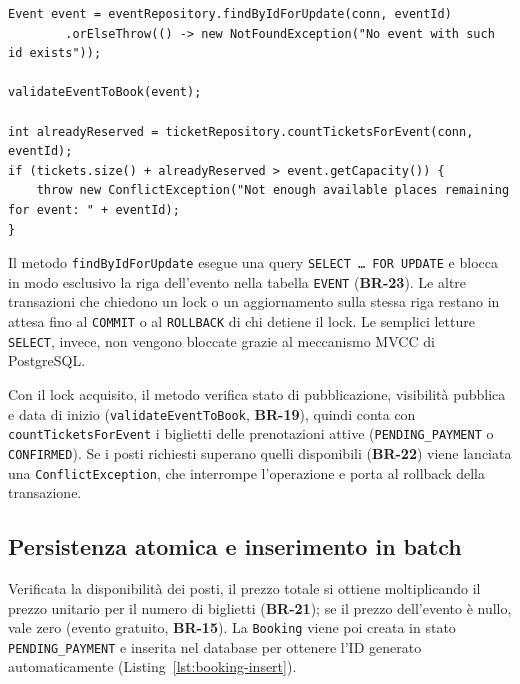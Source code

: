 \begin{lstlisting}[caption={Acquisizione del lock pessimistico sull'evento e controllo della capienza.}, label={lst:booking-lock}]
Event event = eventRepository.findByIdForUpdate(conn, eventId)
        .orElseThrow(() -> new NotFoundException("No event with such id exists"));

validateEventToBook(event);

int alreadyReserved = ticketRepository.countTicketsForEvent(conn, eventId);
if (tickets.size() + alreadyReserved > event.getCapacity()) {
    throw new ConflictException("Not enough available places remaining for event: " + eventId);
}
\end{lstlisting}

Il metodo \texttt{findByIdForUpdate} esegue una query \texttt{SELECT \dots\ FOR UPDATE} e blocca in modo esclusivo la riga dell'evento nella tabella \texttt{EVENT} (\textbf{BR-23}). Le altre transazioni che chiedono un lock o un aggiornamento sulla stessa riga restano in attesa fino al \texttt{COMMIT} o al \texttt{ROLLBACK} di chi detiene il lock. Le semplici letture \texttt{SELECT}, invece, non vengono bloccate grazie al meccanismo MVCC di PostgreSQL.

Con il lock acquisito, il metodo verifica stato di pubblicazione, visibilità pubblica e data di inizio (\texttt{validateEventToBook}, \textbf{BR-19}), quindi conta con \texttt{countTicketsForEvent} i biglietti delle prenotazioni attive (\texttt{PENDING\_PAYMENT} o \texttt{CONFIRMED}). Se i posti richiesti superano quelli disponibili (\textbf{BR-22}) viene lanciata una \texttt{ConflictException}, che interrompe l'operazione e porta al rollback della transazione.

\subsection{Persistenza atomica e inserimento in batch}
\label{sec:creazione-batch-biglietti}

Verificata la disponibilità dei posti, il prezzo totale si ottiene moltiplicando il prezzo unitario per il numero di biglietti (\textbf{BR-21}); se il prezzo dell'evento è nullo, vale zero (evento gratuito, \textbf{BR-15}). La \texttt{Booking} viene poi creata in stato \texttt{PENDING\_PAYMENT} e inserita nel database per ottenere l'ID generato automaticamente (Listing~\ref{lst:booking-insert}).

